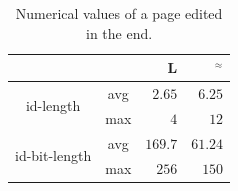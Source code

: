 \begin{table}[h]
  \begin{center}
    \begin{tabular}{|c|c|r|r|}
      \cline{3-4}
      \multicolumn{2}{c|}{} &\textbf{L} &\textbf{\NAME{}}$^\approx$\\
      \cline{3-4}
      \hline
      \multirow{2}{*}{id-length} & avg & $2.65$ & $6.25$ \\
      \cline{2-4}
      &  max & $4$ & $12$ \\
      \hline
      \hline
      \multirow{2}{*}{id-bit-length} & avg & $169.7$ & $61.24$\\
      \cline{2-4}
      & max & $256$ & $150$ \\
      \hline
    \end{tabular}
    \caption{Numerical values of a page edited in the end.}
    \label{tab:queuePage}
  \end{center}
\end{table}


